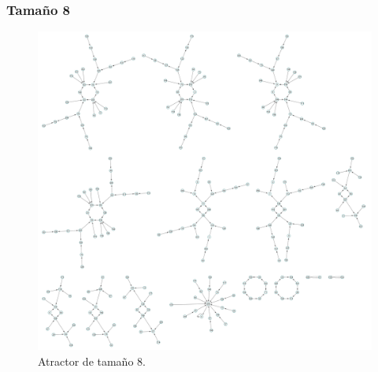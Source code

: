 \documentclass[11pt]{article}
\begin{document}
			\subsubsection{Tamaño 8}
			\begin{figure}[H]
			\centering
			\includegraphics[scale=0.1]{resources/Atractores54/atractor_54_size_8.png}
			\caption{Atractor de tamaño 8.}\label{fig:picture}
			\end{figure}
\end{document}
